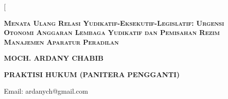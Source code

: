 \documentclass[12pt,a4paper,twocolumn]{article}
\begin{document}
\twocolumn[
    \begin{@twocolumnfalse}
        \begin{center}
            {\fontsize{13.5}{16}\selectfont \textbf{\textsc{Menata Ulang Relasi Yudikatif-Eksekutif-Legislatif: Urgensi Otonomi Anggaran Lembaga Yudikatif dan Pemisahan Rezim Manajemen Aparatur Peradilan}}\par}
            \vspace{0.4em}
            {\fontsize{10.5}{12}\selectfont \textbf{MOCH. ARDANY CHABIB}\par}
            {\fontsize{9.5}{11}\selectfont \textbf{PRAKTISI HUKUM (PANITERA PENGGANTI)}\par}
            {\fontsize{9}{10.5}\selectfont Email: ardanych@gmail.com\par}
            \vspace{0.4em}


\end{center}
\end{@twocolumnfalse}
\end{document}
